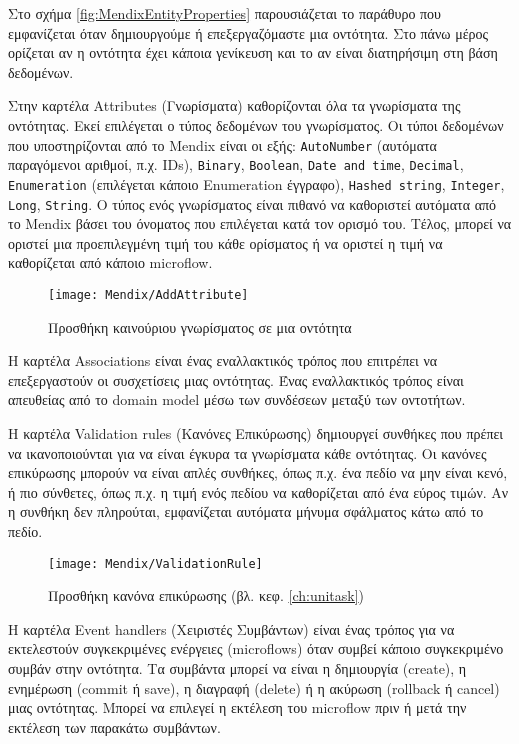                 Στο σχήμα \ref{fig:MendixEntityProperties} παρουσιάζεται το παράθυρο που εμφανίζεται όταν δημιουργούμε ή επεξεργαζόμαστε μια οντότητα. Στο πάνω μέρος ορίζεται αν η οντότητα έχει κάποια γενίκευση και το αν είναι διατηρήσιμη στη βάση δεδομένων.

                Στην καρτέλα Attributes (Γνωρίσματα) καθορίζονται όλα τα γνωρίσματα της οντότητας. Εκεί επιλέγεται ο τύπος δεδομένων του γνωρίσματος. Οι τύποι δεδομένων που υποστηρίζονται από το Mendix είναι οι εξής: \texttt{AutoNumber} (αυτόματα παραγόμενοι αριθμοί, π.χ. IDs), \texttt{Binary}, \texttt{Boolean}, \texttt{Date and time}, \texttt{Decimal}, \texttt{Enumeration} (επιλέγεται κάποιο Enumeration έγγραφο), \texttt{Hashed string}, \texttt{Integer}, \texttt{Long}, \texttt{String}. Ο τύπος ενός γνωρίσματος είναι πιθανό να καθοριστεί αυτόματα από το Mendix βάσει του όνοματος που επιλέγεται κατά τον ορισμό του. Τέλος, μπορεί να οριστεί μια προεπιλεγμένη τιμή του κάθε ορίσματος ή να οριστεί η τιμή να καθορίζεται από κάποιο microflow.

                \begin{figure}[h!] \noindent \centering
                        \texttt{[image: Mendix/AddAttribute]}
                        \caption{\centering Προσθήκη καινούριου γνωρίσματος σε μια οντότητα}
                \end{figure}

                Η καρτέλα Associations είναι ένας εναλλακτικός τρόπος που επιτρέπει να επεξεργαστούν οι συσχετίσεις μιας οντότητας. Ένας εναλλακτικός τρόπος είναι απευθείας από το domain model μέσω των συνδέσεων μεταξύ των οντοτήτων.

                Η καρτέλα Validation rules (Κανόνες Επικύρωσης) δημιουργεί συνθήκες που πρέπει να ικανοποιούνται για να είναι έγκυρα τα γνωρίσματα κάθε οντότητας. Οι κανόνες επικύρωσης μπορούν να είναι απλές συνθήκες, όπως π.χ. ένα πεδίο να μην είναι κενό, ή πιο σύνθετες, όπως π.χ. η τιμή ενός πεδίου να καθορίζεται από ένα εύρος τιμών. Αν η συνθήκη δεν πληρούται, εμφανίζεται αυτόματα μήνυμα σφάλματος κάτω από το πεδίο.

                \begin{figure}[h!] \noindent \centering
                        \texttt{[image: Mendix/ValidationRule]}
                        \caption{\centering Προσθήκη κανόνα επικύρωσης (βλ. κεφ. \ref{ch:unitask})}
                \end{figure}

                Η καρτέλα Event handlers (Χειριστές Συμβάντων) είναι ένας τρόπος για να εκτελεστούν συγκεκριμένες ενέργειες (microflows) όταν συμβεί κάποιο συγκεκριμένο συμβάν στην οντότητα. Τα συμβάντα μπορεί να είναι η δημιουργία (create), η ενημέρωση (commit ή save), η διαγραφή (delete) ή η ακύρωση (rollback ή cancel) μιας οντότητας. Μπορεί να επιλεγεί η εκτέλεση του microflow πριν ή μετά την εκτέλεση των παρακάτω συμβάντων.

